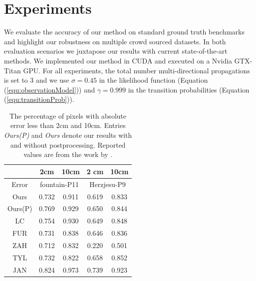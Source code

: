  

\section{Experiments} \label{sec2:experiment}
We evaluate the accuracy of our method on standard ground truth benchmarks and highlight our robustness on multiple crowd sourced datasets.
In both evaluation scenarios we juxtapose our results with current state-of-the-art methods.
We implemented our method in CUDA and executed on a Nvidia GTX-Titan GPU.
For all experiments, the total number multi-directional propagations is set to 3 and we use  $\sigma = 0.45$ in the likelihood function (Equation (\ref{equ:observationModel})) and $\gamma=0.999$ in the transition probabilities (Equation (\ref{equ:transitionProb})).  %

\begin{table}[t]
\centering
    \begin{tabular}{|c|c|c|c|c|}
    \hline
         &  2cm &  10cm  & 2 cm & 10cm\\
    \hline
    Error & \multicolumn{2}{|c|}{fountain-P11} & \multicolumn{2}{|c|}{Herzjesu-P9}        \\
    \hline
    Ours & 0.732   & 0.911  & 0.619 & 0.833\\
    \hline
    Ours(P)& 0.769   & 0.929  & 0.650 & 0.844\\
    \hline
    LC \cite{LeastCommitment_3DIMPVT2012} & 0.754 &  {0.930} & 0.649 & 0.848 \\
    \hline
    FUR \cite{FURUKAWA_PAMI2010} & 0.731 & 0.838 & 0.646  & 0.836\\
    \hline
    ZAH \cite{Zaharescu_PAMI2011} & 0.712 & 0.832 & 0.220 & 0.501\\
    \hline
    TYL \cite{TYL} &0.732 & 0.822 & 0.658 & 0.852\\
    \hline
    JAN \cite{JAN} &0.824 & 0.973 & 0.739 & 0.923\\
    \hline
    \end{tabular}
\caption{The percentage of pixels with absolute error less than 2cm and 10cm. Entries {\em Ours(P)}  and {\em Ours}  denote our results with and without postprocessing.  Reported values are from the work by \citet{LeastCommitment_3DIMPVT2012}.}
\label{tab:data}
\end{table}

